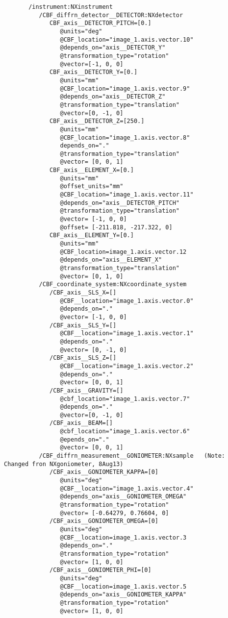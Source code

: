 \documentclass[11pt]{article}
\begin{document}
\footnotesize{\begin{verbatim}
       /instrument:NXinstrument
          /CBF_diffrn_detector__DETECTOR:NXdetector
             CBF_axis__DETECTOR_PITCH=[0.]
                @units="deg"
                @CBF_location="image_1.axis.vector.10"
                @depends_on="axis__DETECTOR_Y"
                @transformation_type="rotation"
                @vector=[-1, 0, 0]
             CBF_axis__DETECTOR_Y=[0.]
                @units="mm"
                @CBF_location="image_1.axis.vector.9"
                @depends_on="axis__DETECTOR_Z"
                @transformation_type="translation"
                @vector=[0, -1, 0]
             CBF_axis__DETECTOR_Z=[250.]
                @units="mm"
                @CBF_location="image_1.axis.vector.8"
                depends_on="."
                @transformation_type="translation"
                @vector= [0, 0, 1]
             CBF_axis__ELEMENT_X=[0.]
                @units="mm"
                @offset_units="mm"
                @CBF_location="image_1.axis.vector.11"
                @depends_on="axis__DETECTOR_PITCH"
                @transformation_type="translation"
                @vector= [-1, 0, 0]
                @offset= [-211.818, -217.322, 0]
             CBF_axis__ELEMENT_Y=[0.]
                @units="mm"
                @CBF_location=image_1.axis.vector.12
                @depends_on="axis__ELEMENT_X"
                @transformation_type="translation"
                @vector= [0, 1, 0]
          /CBF_coordinate_system:NXcoordinate_system
             /CBF_axis__SLS_X=[]
                @CBF__location="image_1.axis.vector.0"
                @depends_on="."
                @vector= [-1, 0, 0]
             /CBF_axis__SLS_Y=[]
                @CBF__location="image_1.axis.vector.1"
                @depends_on="."
                @vector= [0, -1, 0]
             /CBF_axis__SLS_Z=[]
                @CBF__location="image_1.axis.vector.2"
                @depends_on="."
                @vector= [0, 0, 1]
             /CBF_axis__GRAVITY=[]
                @cbf_location="image_1.axis.vector.7"
                @depends_on="."
                @vector=[0, -1, 0]
             /CBF_axis__BEAM=[]
                @cbf_location="image_1.axis.vector.6"
                @epends_on="."
                @vector= [0, 0, 1]
          /CBF_diffrn_measurement__GONIOMETER:NXsample   (Note:  Changed fron NXgoniometer, 8Aug13)
             /CBF_axis__GONIOMETER_KAPPA=[0]
                @units="deg"
                @CBF__location="image_1.axis.vector.4"
                @depends_on="axis__GONIOMETER_OMEGA"
                @transformation_type="rotation"
                @vector= [-0.64279, 0.76604, 0]
             /CBF_axis__GONIOMETER_OMEGA=[0]
                @units="deg"
                @CBF__location=image_1.axis.vector.3
                @depends_on="."
                @transformation_type="rotation"
                @vector= [1, 0, 0]
             /CBF_axis__GONIOMETER_PHI=[0]
                @units="deg"
                @CBF__location=image_1.axis.vector.5
                @depends_on="axis__GONIOMETER_KAPPA"
                @transformation_type="rotation"
                @vector= [1, 0, 0]
\end{verbatim}}
\end{document}
